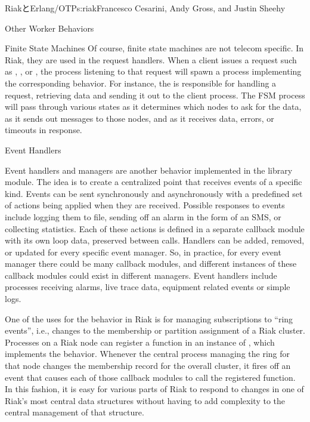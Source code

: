\begin{aosachapter}{RiakとErlang/OTP}{s:riak}{Francesco Cesarini, Andy Gross, and Justin Sheehy}
\begin{aosasect1}{Other Worker Behaviors}
\begin{aosasect2}{Finite State Machines}
Of course, finite state machines are not telecom specific. In Riak,
they are used in the request handlers. When a client issues a request
such as , , or , the process
listening to that request will spawn a process implementing the
corresponding  behavior. For instance, the
 is responsible for handling a 
request, retrieving data and sending it out to the client process. The
FSM process will pass through various states as it determines which
nodes to ask for the data, as it sends out messages to those nodes, and as
it receives data, errors, or timeouts in response.

\end{aosasect2}

\begin{aosasect2}{Event Handlers}

Event handlers and managers are another behavior implemented in the
 library module. The idea is to create a centralized
point that receives events of a specific kind. Events can be sent
synchronously and asynchronously with a predefined set of actions
being applied when they are received. Possible responses to events
include logging them to file, sending off an alarm in the form of an
SMS, or collecting statistics. Each of these actions is defined in a
separate callback module with its own loop data, preserved between
calls. Handlers can be added, removed, or updated for every specific
event manager. So, in practice, for every event manager there could
be many callback modules, and different instances of these callback
modules could exist in different managers. Event handlers include
processes receiving alarms, live trace data, equipment related events
or simple logs.

One of the uses for the  behavior in Riak is for
managing subscriptions to ``ring events'', i.e., changes to the
membership or partition assignment of a Riak cluster.  Processes on a
Riak node can register a function in an instance of
, which implements the
 behavior.  Whenever the central process managing the
ring for that node changes the membership record for the overall
cluster, it fires off an event that causes each of those callback
modules to call the registered function.  In this fashion, it is
easy for various parts of Riak to respond to changes in one of Riak's
most central data structures without having to add complexity to the
central management of that structure.


\end{aosasect2}
\end{aosasect1}
\end{aosachapter}
